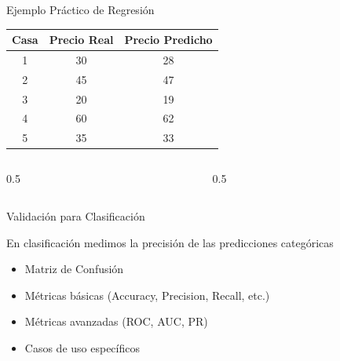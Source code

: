 \documentclass{beamer}
\begin{document}
\begin{frame}{Ejemplo Práctico de Regresión}
    \begin{center}
        \begin{tabular}{|c|c|c|}
        \hline
        \textbf{Casa} & \textbf{Precio Real} & \textbf{Precio Predicho} \\
        \hline
        1 & 30 & 28 \\
        2 & 45 & 47 \\
        3 & 20 & 19 \\
        4 & 60 & 62 \\
        5 & 35 & 33 \\
        \hline
        \end{tabular}
    \end{center}
    
    \vspace{1em}
    
    \begin{columns}
        \begin{column}{0.5\textwidth}
            \begin{itemize}
                 
                 
                 
            \end{itemize}
        \end{column}
        \begin{column}{0.5\textwidth}
            \begin{itemize}
                 
                 
            \end{itemize}
        \end{column}
    \end{columns}
\end{frame}

\begin{frame}{Validación para Clasificación}
    \begin{center}
        \Large En clasificación medimos la precisión de las predicciones categóricas
    \end{center}
    
    \vspace{1em}
    
    \begin{itemize}
        \item Matriz de Confusión
        \item Métricas básicas (Accuracy, Precision, Recall, etc.)
        \item Métricas avanzadas (ROC, AUC, PR)
        \item Casos de uso específicos
    \end{itemize}
\end{frame}
\end{document}
